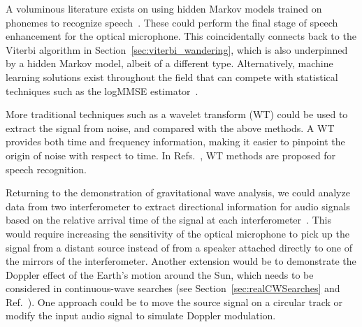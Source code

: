 \documentclass[paper-main.tex]{subfiles}
\begin{document}
A voluminous literature exists on using hidden Markov models trained on phonemes to recognize speech~\cite{HMM_english}. 
These could perform the final stage of speech enhancement for the optical microphone. 
This coincidentally connects back to the Viterbi algorithm in Section~\ref{sec:viterbi_wandering}, which is also underpinned by a hidden Markov model, albeit of a different type. Alternatively, machine learning solutions exist throughout the field that can compete with statistical techniques such as the logMMSE estimator~\cite{SEGAN}.


More traditional techniques such as a wavelet transform (WT) \citep{nason1995stationary} could be used to extract the signal from noise, and compared with the above methods. 
A WT provides both time and frequency information, making it easier to pinpoint the origin of noise with respect to time. 
In Refs.~\cite{tufekci2000feature,agbinya1996discrete}, WT methods are proposed for speech recognition. 


Returning to the demonstration of gravitational wave analysis, we could analyze data from two interferometer to extract directional information for audio signals based on the relative arrival time of the signal at each interferometer~\cite{GW150914}.
This would require increasing the sensitivity of the optical microphone to pick up the signal from a distant source instead of from a speaker attached directly to one of the mirrors of the interferometer.
Another extension would be to demonstrate the Doppler effect of the Earth's motion around the Sun, which needs to be considered in continuous-wave searches (see Section~\ref{sec:realCWSearches} and Ref.~\cite{JKS:1998}). 
One approach could be to move the source signal on a circular track or modify the input audio signal to simulate Doppler modulation. 
\end{document}
